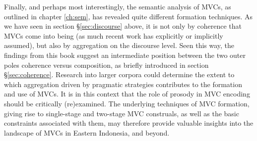 Finally, and perhaps most interestingly, the semantic analysis of MVCs, as outlined in chapter \ref{ch:sem}, has revealed quite different formation techniques. As we have seen in section §\ref{sec:discourse} above, it is not only by coherence that MVCs come into being (as much recent work has explicitly or implicitly assumed), but also by aggregation on the discourse level. Seen this way, the findings from this book suggest an intermediate position between the two outer poles coherence versus composition, as briefly introduced in section §\ref{sec:coherence}. Research into larger corpora could determine the extent to which aggregation driven by pragmatic strategies contributes to the formation and use of MVCs. It is in this context that the role of prosody in MVC encoding should be critically (re)examined. The underlying techniques of MVC formation, giving rise to single-stage and two-stage MVC construals, as well as the basic constraints associated with them, may therefore provide valuable insights into the landscape of MVCs in Eastern Indonesia, and beyond.